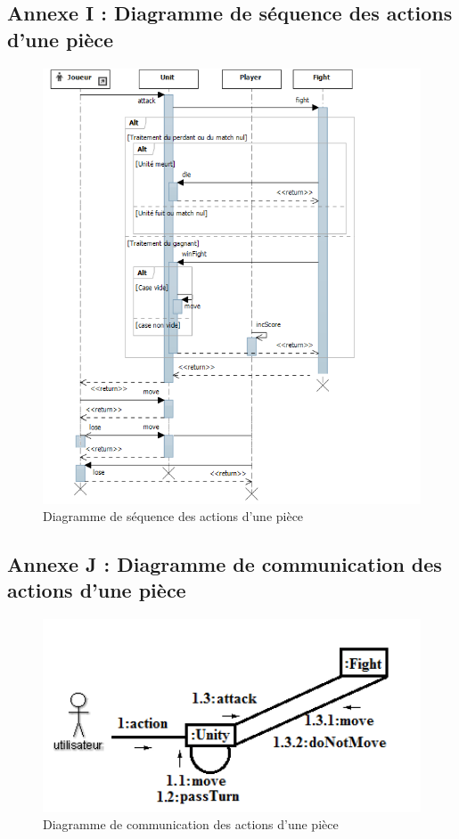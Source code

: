 \subsection{Annexe I : Diagramme de séquence des actions d'une pièce}
\begin{figure}[!h]
\centering
\includegraphics[width=1\textwidth]{img/Actions.png}
\caption{Diagramme de séquence des actions d'une pièce}
\end{figure}
\clearpage

\subsection{Annexe J : Diagramme de communication des actions d'une pièce}
\begin{figure}[!h]
\centering
\includegraphics[width=1\textwidth]{img/comm2.png}
\caption{Diagramme de communication des actions d'une pièce}
\end{figure}
\clearpage

